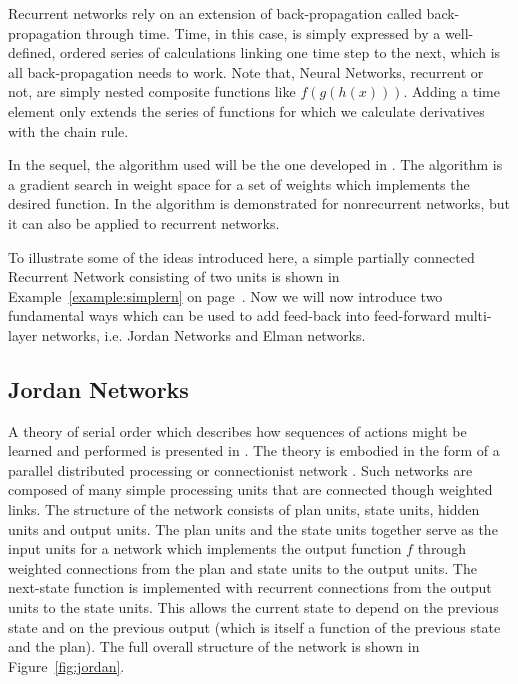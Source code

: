 Recurrent networks rely on an extension of back-propagation called back-propagation through time. Time, in this case, is simply expressed by a well-defined, ordered series of calculations linking one time step to the next, which is all back-propagation needs to work. Note that, Neural Networks, recurrent or not, are simply nested composite functions like $f(g(h(x)))$. Adding a time element only extends the series of functions for which we calculate derivatives with the chain rule.

In the sequel, the algorithm used will be the one developed in \cite{rumelhart1986leanrning}. The algorithm is a gradient search in weight space for a set of weights which implements the desired function. In \cite{rumelhart1986leanrning} the algorithm is demonstrated for nonrecurrent networks, but it can also be applied to recurrent networks.

To illustrate some of the ideas introduced here, a simple partially connected Recurrent Network consisting of two units is shown in Example~\ref{example:simplern} on page~\pageref{example:simplern}. Now we will now introduce two fundamental ways which can be used to add feed-back into feed-forward multi-layer networks, i.e. Jordan Networks and Elman networks. 

\subsection{Jordan Networks}
\label{sec:preliminaries:nn:jordan}

A theory of serial order which describes how sequences of actions might be learned and performed is presented in \cite{jordan1997serial}. The theory is embodied in the form of a parallel distributed processing \cite{rumelhart1986parallel} or connectionist network \cite{feldman1982connectionist}. Such networks are composed of many simple processing units that are connected though weighted links. The structure of the network consists of plan units, state units, hidden units and output units. The plan units and the state units together serve as the input units for a network which implements the output function $f$ through weighted connections from the plan and state units to the output units. The next-state function is implemented with recurrent connections from the output units to the state units. This allows the current state to depend on the previous state and on the previous output (which is itself a function of the previous state and the plan). The full overall structure of the network is shown in Figure~\ref{fig:jordan}.

